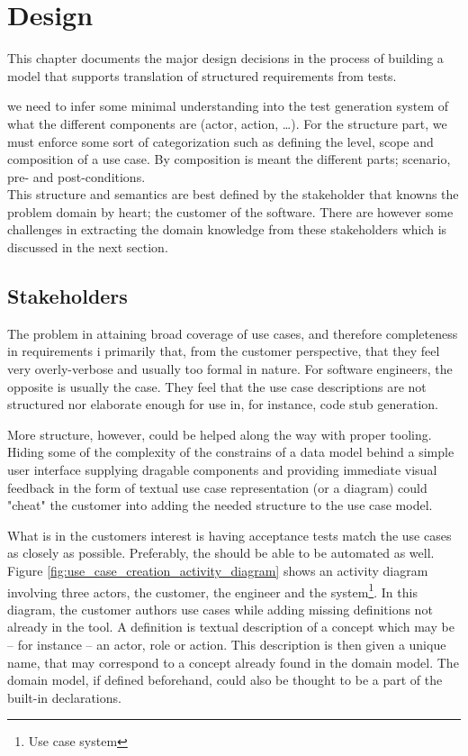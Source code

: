 \chapter{Design}
This chapter documents the major design decisions in the process of building a model that supports translation of structured requirements from tests.

we need to infer some minimal understanding into the test generation system of what the different components are (actor, action, \dots). For the structure part, we must enforce some sort of categorization such as defining the level, scope and composition of a use case. By composition is meant the different parts; scenario, pre- and post-conditions.\\
This structure and semantics are best defined by the stakeholder that knowns the problem domain by heart; the customer of the software. There are however some challenges in extracting the domain knowledge from these stakeholders which is discussed in the next section.

\section{Stakeholders}
The problem in attaining broad coverage of use cases, and therefore completeness in requirements i primarily that, from the customer perspective, that they feel very overly-verbose and usually too formal in nature. For software engineers, the opposite is usually the case. They feel that the use case descriptions are not structured nor elaborate enough for use in, for instance, code stub generation.

More structure, however, could be helped along the way with proper tooling. Hiding some of the complexity of the constrains of a data model behind a simple user interface supplying dragable components and providing immediate visual feedback in the form of textual use case representation (or a diagram) could "cheat" the customer into adding the needed structure to the use case model.

What is in the customers interest is having acceptance tests match the use cases as closely as possible. Preferably, the should be able to be automated as well. Figure \ref{fig:use_case_creation_activity_diagram} shows an activity diagram involving three actors, the customer, the engineer and the system\footnote{Use case system}. In this diagram, the customer authors use cases while adding missing definitions not already in the tool. A definition is textual description of a concept which may be -- for instance -- an actor, role or action. This description is then given a unique name, that may correspond to a concept already found in the domain model. The domain model, if defined beforehand, could also be thought to be a part of the built-in declarations.
